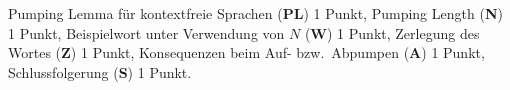 \begin{bewertung}
Pumping Lemma für kontextfreie Sprachen ({\bf PL}) 1 Punkt,
Pumping Length ({\bf N}) 1 Punkt,
Beispielwort unter Verwendung von $N$ ({\bf W}) 1 Punkt,
Zerlegung des Wortes ({\bf Z}) 1 Punkt,
Konsequenzen beim Auf- bzw.~Abpumpen ({\bf A}) 1 Punkt,
Schlussfolgerung ({\bf S}) 1 Punkt.
\end{bewertung}

